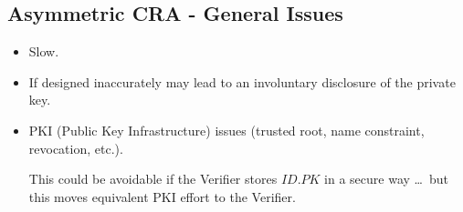 \subsection*{Asymmetric CRA - General Issues}
\begin{itemize}
    \item Slow.
    \item If designed inaccurately may lead to an involuntary disclosure of the private key.
    \item PKI (Public Key Infrastructure) issues (trusted root, name constraint, revocation, etc.).
    
    This could be avoidable if the Verifier stores $ID.PK$ in a secure way \dots \ but this moves equivalent PKI effort to the Verifier.
\end{itemize}

